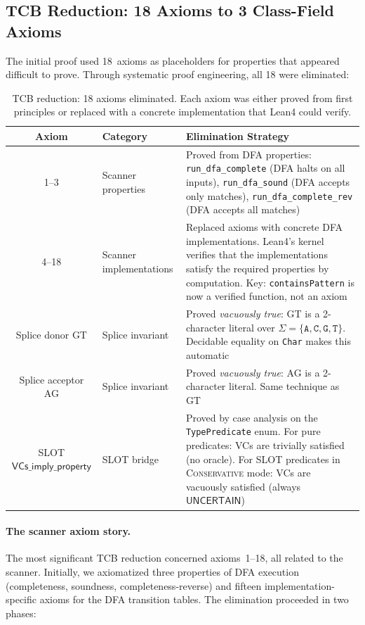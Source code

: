 \documentclass[acmsmall,review,anonymous]{acmart}
\newcommand{\UNCERTAIN}{\ensuremath{\mathsf{UNCERTAIN}}\xspace}
\newcommand{\CONSERVATIVE}{\textsc{Conservative}\xspace}
\begin{document}
\subsection{TCB Reduction: 18 Axioms to 3 Class-Field Axioms}\label{sec:tcb-reduction}

The initial proof used 18~axioms as placeholders for properties that
appeared difficult to prove.
Through systematic proof engineering, all 18 were eliminated:

\begin{table}[t]
\centering
\caption{TCB reduction: 18 axioms eliminated. Each axiom was either
         proved from first principles or replaced with a concrete
         implementation that Lean4 could verify.}
\label{tab:axiom-elim}
\begin{tabular}{clp{5.5cm}}
\toprule
\textbf{Axiom} & \textbf{Category} & \textbf{Elimination Strategy} \\
\midrule
1--3 & Scanner properties &
  Proved from DFA properties: \texttt{run\_dfa\_complete}
  (DFA halts on all inputs), \texttt{run\_dfa\_sound}
  (DFA accepts only matches), \texttt{run\_dfa\_complete\_rev}
  (DFA accepts all matches) \\
\midrule
4--18 & Scanner implementations &
  Replaced axioms with concrete DFA implementations.
  Lean4's kernel verifies that the implementations satisfy the
  required properties by computation.
  Key: \texttt{containsPattern} is now a verified function, not
  an axiom \\
\midrule
Splice donor GT & Splice invariant &
  Proved \emph{vacuously true}: GT is a 2-character literal over
  $\Sigma = \{\texttt{A},\texttt{C},\texttt{G},\texttt{T}\}$.
  Decidable equality on \texttt{Char} makes this automatic \\
\midrule
Splice acceptor AG & Splice invariant &
  Proved \emph{vacuously true}: AG is a 2-character literal.
  Same technique as GT \\
\midrule
SLOT $\textsf{VCs\_imply\_property}$ & SLOT bridge &
  Proved by case analysis on the \texttt{TypePredicate} enum.
  For pure predicates: VCs are trivially satisfied (no oracle).
  For SLOT predicates in \CONSERVATIVE{} mode: VCs are vacuously
  satisfied (always \UNCERTAIN) \\
\bottomrule
\end{tabular}
\end{table}

\paragraph{The scanner axiom story.}
The most significant TCB reduction concerned axioms~1--18, all related
to the scanner.
Initially, we axiomatized three properties of DFA execution
(completeness, soundness, completeness-reverse) and fifteen
implementation-specific axioms for the DFA transition tables.
The elimination proceeded in two phases:
\end{document}
